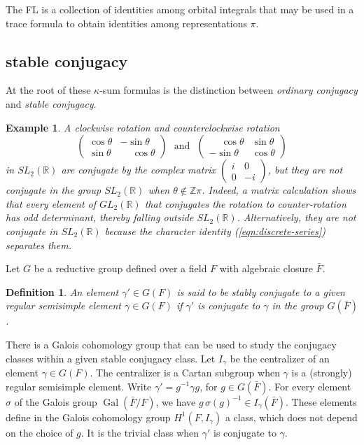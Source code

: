 \documentclass[brochure,english,12pt]{bourbaki}
\theoremstyle{plain}
\newtheorem{example}[equation]{Example}
\newtheorem{definition}[equation]{Definition}
\def\op#1{{\operatorname{#1}}}
\newcommand{\ring}[1]{\mathbb{#1}}
\begin{document}
The FL is a collection of identities among orbital integrals that may be used in a trace formula to
obtain identities among representations $\pi$.

\subsection{stable conjugacy}\label{sec:stable}

At the root of these $\kappa$-sum formulas is the distinction between
{\it ordinary conjugacy} and {\it stable conjugacy}.  
\begin{example}
A clockwise rotation and counterclockwise rotation
\[
\begin{pmatrix}\cos\theta &-\sin\theta\\\sin\theta &\phantom{-}\cos\theta\end{pmatrix}
\text{~~and~~}
\begin{pmatrix}\phantom{-}\cos\theta &\sin\theta\\-\sin\theta &\cos\theta\end{pmatrix}
\]
in $SL_2(\ring{R})$ are conjugate by the complex matrix $\begin{pmatrix}i&0\\0&-i\end{pmatrix}$, 
but they are not conjugate
in the group $SL_2(\ring{R})$ when $\theta\not\in\ring{Z}\pi$.  Indeed,
a matrix calculation shows that every element of $GL_2(\ring{R})$ that
conjugates the rotation to counter-rotation has odd determinant,
thereby falling outside $SL_2(\ring{R})$.  Alternatively, they are not
conjugate in $SL_2(\ring{R})$ because the character identity
(\ref{eqn:discrete-series}) separates them.
\end{example}


Let $G$ be a reductive group defined over a field
  $F$ with algebraic closure $\bar F$. 

\begin{definition}  An element
  $\gamma'\in G(F)$ is said to be {\it stably conjugate} to a given regular
  semisimple element $\gamma\in G(F)$ if $\gamma'$ is conjugate to $\gamma$ in
  the group $G(\bar F)$.
\end{definition}


There is a Galois cohomology group that can be used to study the conjugacy classes within
a given stable conjugacy class.  Let $I_\gamma$ be the centralizer of an element $\gamma\in G(F)$.
The centralizer is a Cartan subgroup when $\gamma$ is a (strongly) regular semisimple element.
Write $\gamma'=g^{-1}\gamma g$, for $g\in G(\bar F)$.
For every element $\sigma$ of the Galois group $\op{Gal}(\bar F/F)$,  we have
 $g\,\sigma(g)^{-1}\in I_\gamma(\bar F)$.  These elements define  in
the Galois cohomology group $H^1(F,I_\gamma)$ a class, which does not depend
on the choice of $g$.  It is the trivial class when
$\gamma'$ is conjugate to $\gamma$.
\end{document}
